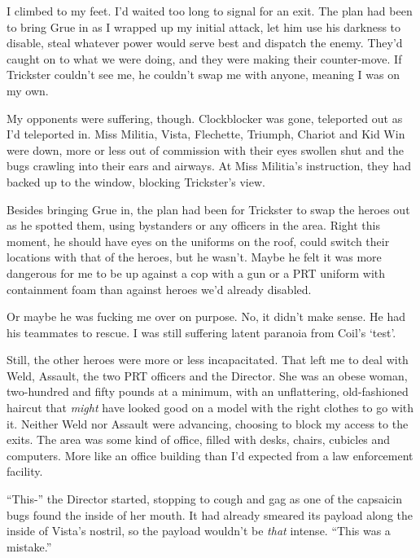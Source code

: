 I climbed to my feet.  I'd waited too long to signal for an exit.  The plan had been to bring Grue in as I wrapped up my initial attack, let him use his darkness to disable, steal whatever power would serve best and dispatch the enemy.  They'd caught on to what we were doing, and they were making their counter-move.  If Trickster couldn't see me, he couldn't swap me with anyone, meaning I was on my own.



My opponents were suffering, though.  Clockblocker was gone, teleported out as I'd teleported in.  Miss Militia, Vista, Flechette, Triumph, Chariot and Kid Win were down, more or less out of commission with their eyes swollen shut and the bugs crawling into their ears and airways.  At Miss Militia's instruction, they had backed up to the window, blocking Trickster's view.



Besides bringing Grue in, the plan had been for Trickster to swap the heroes out as he spotted them, using bystanders or any officers in the area.  Right this moment, he should have eyes on the uniforms on the roof, could switch their locations with that of the heroes, but he wasn't.  Maybe he felt it was more dangerous for me to be up against a cop with a gun or a PRT uniform with containment foam than against heroes we'd already disabled.



Or maybe he was fucking me over on purpose.  No, it didn't make sense.  He had his teammates to rescue.  I was still suffering latent paranoia from Coil's `test'.



Still, the other heroes were more or less incapacitated.  That left me to deal with Weld, Assault, the two PRT officers and the Director.  She was an obese woman, two-hundred and fifty pounds at a minimum, with an unflattering, old-fashioned haircut that \emph{might} have looked good on a model with the right clothes to go with it.  Neither Weld nor Assault were advancing, choosing to block my access to the exits.  The area was some kind of office, filled with desks, chairs, cubicles and computers.  More like an office building than I'd expected from a law enforcement facility.



``This-'' the Director started, stopping to cough and gag as one of the capsaicin bugs found the inside of her mouth.  It had already smeared its payload along the inside of Vista's nostril, so the payload wouldn't be \emph{that} intense.  ``This was a mistake.''



